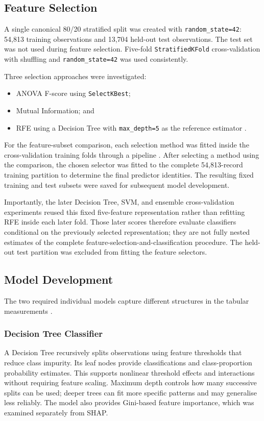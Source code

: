 \documentclass[11pt,a4paper]{article}
\newcommand{\code}[1]{\texttt{#1}}
\begin{document}
\subsection{Feature Selection}

A single canonical 80/20 stratified split was created with \code{random\_state=42}: 54,813 training observations and 13,704 held-out test observations. The test set was not used during feature selection. Five-fold \code{StratifiedKFold} cross-validation with shuffling and \code{random\_state=42} was used consistently.

Three selection approaches were investigated:
\begin{itemize}
    \item ANOVA F-score using \code{SelectKBest};
    \item Mutual Information; and
    \item RFE using a Decision Tree with \code{max\_depth=5} as the reference estimator \cite{theerthagiri2022}.
\end{itemize}

For the feature-subset comparison, each selection method was fitted
inside the cross-validation training folds through a pipeline
\cite{cawley2010}. After selecting a method using the comparison, the chosen selector was fitted to the complete
54,813-record training partition to determine the final predictor identities.
The resulting fixed training and test subsets were saved for subsequent
model development.

Importantly, the later Decision Tree, SVM, and ensemble cross-validation
experiments reused this fixed five-feature representation rather than
refitting RFE inside each later fold. Those later scores therefore
evaluate classifiers conditional on the previously selected
representation; they are not fully nested estimates of the complete
feature-selection-and-classification procedure. The held-out test
partition was excluded from fitting the feature selectors.

\subsection{Model Development}

The two required individual models capture different structures in the tabular measurements \cite{pedregosa2011}.

\subsubsection{Decision Tree Classifier}
A Decision Tree recursively splits observations using feature thresholds that reduce class impurity. Its leaf nodes provide classifications and class-proportion probability estimates. This supports nonlinear threshold effects and interactions without requiring feature scaling. Maximum depth controls how many successive splits can be used; deeper trees can fit more specific patterns and may generalise less reliably. The model also provides Gini-based feature importance, which was examined separately from SHAP.
\end{document}
